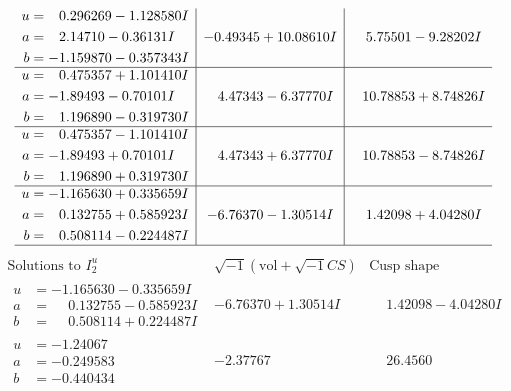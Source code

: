 \documentclass[1p]{elsarticle_modified}
\theoremstyle{definition}
\newcommand{\I}{\sqrt{-1}}
\begin{document}
$$\begin{array}{c|c|c}
\begin{aligned}
u &= \phantom{-}0.296269 - 1.128580 I \\
a &= \phantom{-}2.14710 - 0.36131 I \\
b &= -1.159870 - 0.357343 I\end{aligned}
 & -0.49345 + 10.08610 I & \phantom{-}5.75501 - 9.28202 I \\ \hline\begin{aligned}
u &= \phantom{-}0.475357 + 1.101410 I \\
a &= -1.89493 - 0.70101 I \\
b &= \phantom{-}1.196890 - 0.319730 I\end{aligned}
 & \phantom{-}4.47343 - 6.37770 I & \phantom{-}10.78853 + 8.74826 I \\ \hline\begin{aligned}
u &= \phantom{-}0.475357 - 1.101410 I \\
a &= -1.89493 + 0.70101 I \\
b &= \phantom{-}1.196890 + 0.319730 I\end{aligned}
 & \phantom{-}4.47343 + 6.37770 I & \phantom{-}10.78853 - 8.74826 I \\ \hline\begin{aligned}
u &= -1.165630 + 0.335659 I \\
a &= \phantom{-}0.132755 + 0.585923 I \\
b &= \phantom{-}0.508114 - 0.224487 I\end{aligned}
 & -6.76370 - 1.30514 I & \phantom{-}1.42098 + 4.04280 I\\
 \hline 
 \end{array}$$\newpage$$\begin{array}{c|c|c}  
\text{Solutions to }I^u_{2}& \I (\text{vol} + \sqrt{-1}CS) & \text{Cusp shape}\\
 \hline 
\begin{aligned}
u &= -1.165630 - 0.335659 I \\
a &= \phantom{-}0.132755 - 0.585923 I \\
b &= \phantom{-}0.508114 + 0.224487 I\end{aligned}
 & -6.76370 + 1.30514 I & \phantom{-}1.42098 - 4.04280 I \\ \hline\begin{aligned}
u &= -1.24067\phantom{ +0.000000I} \\
a &= -0.249583\phantom{ +0.000000I} \\
b &= -0.440434\phantom{ +0.000000I}\end{aligned}
 & -2.37767\phantom{ +0.000000I} & \phantom{-}26.4560\phantom{ +0.000000I} \\ \hline\begin{aligned}

\end{aligned}
\end{array}$$
\end{document}
